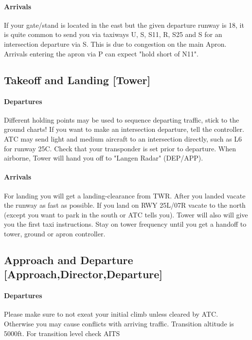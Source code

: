 \paragraph{Arrivals}
If your gate/stand is located in the east but the given departure runway is 18, it is quite common to send
you via taxiways U, S, S11, R, S25 and S for an intersection departure via S. This is due to congestion on the main Apron.\\
Arrivals entering the apron via P can expect "hold short of N11".

\subsection[TWR]{Takeoff and Landing [Tower]}

\paragraph{Departures}
Different holding points may be used to sequence departing traffic, stick to the ground charts!
If you want to make an intersection departure, tell the controller. ATC may send light and medium
aircraft to an intersection directly, such as L6 for runway 25C.
Check that your transponder is set prior to departure.
When airborne, Tower will hand you off to "Langen Radar" (DEP/APP). 

\paragraph{Arrivals}
For landing you will get a landing-clearance from TWR.
After you landed vacate the runway as fast as possible.
If you land on RWY 25L/07R vacate to the north (except you want to park in the south or ATC tells you).
Tower will also will give you the first taxi instructions.
Stay on tower frequency until you get a handoff to tower, ground or apron controller.

\subsection[APP]{Approach and Departure [Approach,Director,Departure]}
\paragraph{Departures}
Please make sure to not exeat your initial climb unless cleared by ATC.
Otherwise you may cause conflicts with arriving traffic.
Transition altitude is 5000ft. For transition level check AITS

